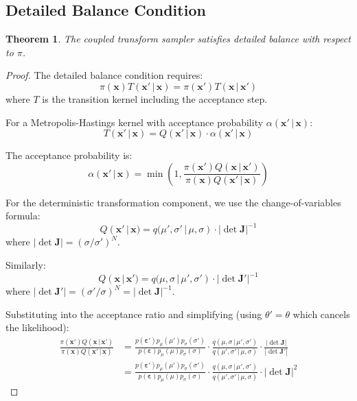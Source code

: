 \documentclass[11pt,a4paper]{article}
\newtheorem{theorem}{Theorem}[section]
\theoremstyle{definition}
\newcommand{\eps}{\varepsilon}
\newcommand{\given}{\,|\,}
\begin{document}
\subsection{Detailed Balance Condition}

\begin{theorem}
The coupled transform sampler satisfies detailed balance with respect to $\pi$.
\end{theorem}

\begin{proof}
The detailed balance condition requires:
\begin{equation}
    \pi(\bm{x}) T(\bm{x}' \given \bm{x}) = \pi(\bm{x}') T(\bm{x} \given \bm{x}')
\end{equation}
where $T$ is the transition kernel including the acceptance step.

For a Metropolis-Hastings kernel with acceptance probability $\alpha(\bm{x}' \given \bm{x})$:
\begin{equation}
    T(\bm{x}' \given \bm{x}) = Q(\bm{x}' \given \bm{x}) \cdot \alpha(\bm{x}' \given \bm{x})
\end{equation}

The acceptance probability is:
\begin{equation}
    \alpha(\bm{x}' \given \bm{x}) = \min\left(1, \frac{\pi(\bm{x}') Q(\bm{x} \given \bm{x}')}
    {\pi(\bm{x}) Q(\bm{x}' \given \bm{x})}\right)
\end{equation}

For the deterministic transformation component, we use the change-of-variables formula:
\begin{equation}
    Q(\bm{x}' \given \bm{x}) = q(\mu', \sigma' \given \mu, \sigma) \cdot |\det \bm{J}|^{-1}
\end{equation}
where $|\det \bm{J}| = (\sigma/\sigma')^N$.

Similarly:
\begin{equation}
    Q(\bm{x} \given \bm{x}') = q(\mu, \sigma \given \mu', \sigma') \cdot |\det \bm{J}'|^{-1}
\end{equation}
where $|\det \bm{J}'| = (\sigma'/\sigma)^N = |\det \bm{J}|^{-1}$.

Substituting into the acceptance ratio and simplifying (using $\theta' = \theta$
which cancels the likelihood):
\begin{align}
    \frac{\pi(\bm{x}') Q(\bm{x} \given \bm{x}')}{\pi(\bm{x}) Q(\bm{x}' \given \bm{x})}
    &= \frac{p(\bm{\eps}') p_\mu(\mu') p_\sigma(\sigma')}{p(\bm{\eps}) p_\mu(\mu) p_\sigma(\sigma)}
    \cdot \frac{q(\mu, \sigma \given \mu', \sigma')}{q(\mu', \sigma' \given \mu, \sigma)}
    \cdot \frac{|\det \bm{J}|}{|\det \bm{J}'|} \\
    &= \frac{p(\bm{\eps}') p_\mu(\mu') p_\sigma(\sigma')}{p(\bm{\eps}) p_\mu(\mu) p_\sigma(\sigma)}
    \cdot \frac{q(\mu, \sigma \given \mu', \sigma')}{q(\mu', \sigma' \given \mu, \sigma)}
    \cdot |\det \bm{J}|^2
\end{align}


\end{proof}
\end{document}
